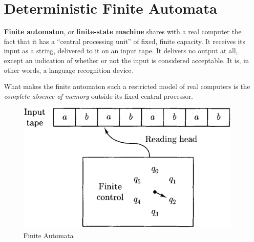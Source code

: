 \section{Deterministic Finite Automata}

\textbf{Finite automaton}, or \textbf{finite-state machine} shares with a real computer the fact that it has a ``central processing unit'' of fixed, finite capacity. It receives its input as a string, delivered to it on an input tape. It delivers no output at all, except an indication of whether or not the input is considered acceptable. It is, in other words, a language recognition device.

What makes the finite automaton such a restricted model of real computers is the \textit{complete absence of memory} outside its fixed central processor.

\begin{figure}[h!]
  \centering
  \includegraphics[width=.5\textwidth]{img/Fig2.1.png}
  \caption{Finite Automata}
\end{figure}

